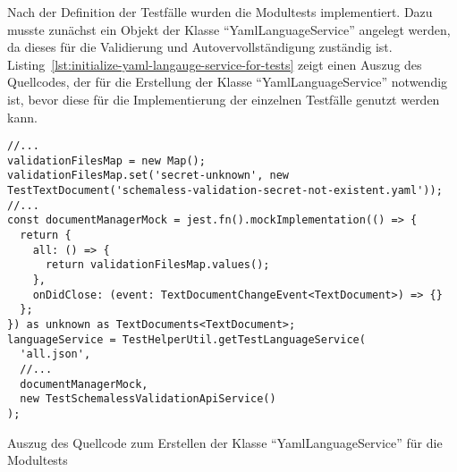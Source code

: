 Nach der Definition der Testfälle wurden die Modultests implementiert. Dazu musste zunächst ein Objekt der Klasse ``YamlLanguageService'' angelegt werden,
da dieses für die Validierung und Autovervollständigung zuständig ist.
Listing~\ref{lst:initialize-yaml-langauge-service-for-tests} zeigt einen Auszug des Quellcodes, der für die Erstellung
der Klasse ``YamlLanguageService'' notwendig ist, bevor diese für die Implementierung der einzelnen Testfälle genutzt werden kann.

\begin{listing}[htp]
    \begin{verbatim}
//...
validationFilesMap = new Map();
validationFilesMap.set('secret-unknown', new TestTextDocument('schemaless-validation-secret-not-existent.yaml'));
//...
const documentManagerMock = jest.fn().mockImplementation(() => {
  return {
    all: () => {
      return validationFilesMap.values();
    },
    onDidClose: (event: TextDocumentChangeEvent<TextDocument>) => {}
  };
}) as unknown as TextDocuments<TextDocument>;
languageService = TestHelperUtil.getTestLanguageService(
  'all.json',
  //...
  documentManagerMock,
  new TestSchemalessValidationApiService()
);
  \end{verbatim}
    \caption{Auszug des Quellcode zum Erstellen der Klasse ``YamlLanguageService'' für die Modultests}
    \label{lst:initialize-yaml-langauge-service-for-tests}
\end{listing}

